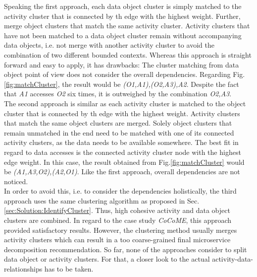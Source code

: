Speaking the first approach, each data object cluster is simply matched to the activity cluster that is connected by th edge with the highest weight. Further, merge object clusters that match the same activity cluster. Activity clusters that have not been matched to a data object cluster remain without accompanying data objects, i.e. not merge with another activity cluster to avoid the combination of two different bounded contexts. Whereas this approach is straight forward and easy to apply, it has drawbacks: The cluster matching from data object point of view does not consider the overall dependencies. Regarding Fig.\ref{fig:matchCluster}, the result would be \textit{(O1,A1),(O2,A3),A2}. Despite the fact that \textit{A1} accesses \textit{O2} six times, it is outweighed by the combination \textit{O2,A3}.  \\
The second approach is similar as each activity cluster is matched to the object cluster that is connected by th edge with the highest weight. Activity clusters that match the same object clusters are merged. Solely object clusters that remain unmatched in the end need to be matched with one of its connected activity clusters, as the data needs to be available somewhere. The best fit in regard to data accesses is the connected activity cluster node with the highest edge weight. In this case, the result obtained from Fig.\ref{fig:matchCluster} would be \textit{(A1,A3,O2),(A2,O1)}. Like the first approach, overall dependencies are not noticed. \\
In order to avoid this, i.e. to consider the dependencies holistically, the third approach uses the same clustering algorithm as proposed in Sec.\ref{sec:Solution:IdentifyCluster}. Thus, high cohesive activity and data object clusters are combined. In regard to the case study \textit{CoCoME}, this approach provided satisfactory results. However, the clustering method usually merges activity clusters which can result in a too coarse-grained final microservice decomposition recommendation. So far, none of the approaches consider to split data object or activity clusters. For that, a closer look to the actual activity-data-relationships has to be taken. \\
